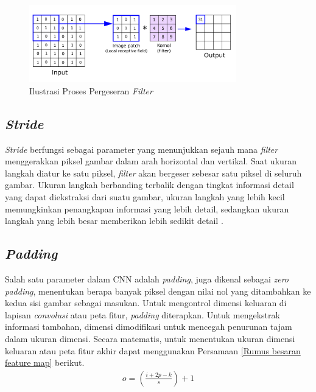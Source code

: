   \begin{figure}[H]
      \centering
      \includegraphics[width=0.8\textwidth]{figures/bab2/cnn.png}
      \caption{Ilustrasi Proses Pergeseran \textit{Filter} \cite{Reynolds}}
      \label{Ilustrasi Proses Pergeseran Filter Pada Convolutional Layer}
    
 \end{figure}

\subsection{\textit{Stride}}

    \textit{Stride} berfungsi sebagai parameter yang menunjukkan sejauh mana \textit{filter} menggerakkan piksel gambar dalam arah horizontal dan vertikal. Saat ukuran langkah diatur ke satu piksel, \textit{filter} akan bergeser sebesar satu piksel di seluruh gambar. Ukuran langkah berbanding terbalik dengan tingkat informasi detail yang dapat diekstraksi dari suatu gambar, ukuran langkah yang lebih kecil memungkinkan penangkapan informasi yang lebih detail, sedangkan ukuran langkah yang lebih besar memberikan lebih sedikit detail \cite{Dewi2018}.



\subsection{\textit{Padding}}

    Salah satu parameter dalam CNN adalah \textit{padding}, juga dikenal sebagai \textit{zero padding}, menentukan berapa banyak piksel dengan nilai nol yang ditambahkan ke kedua sisi gambar sebagai masukan. Untuk mengontrol dimensi keluaran di lapisan \textit{convolusi} atau peta fitur, \textit{padding} diterapkan. Untuk mengekstrak informasi tambahan, dimensi dimodifikasi untuk mencegah penurunan tajam dalam ukuran dimensi. Secara matematis, untuk menentukan ukuran dimensi keluaran atau peta fitur akhir dapat menggunakan Persamaan \ref{Rumus besaran feature map} \cite{hakim2018implementasi} berikut.
    \begin{equation}
        \begin{aligned}
          o = \left( \frac{i + 2p - k}{s} \right) + 1
      \end{aligned}\label{Rumus besaran feature map}
    \end{equation}



